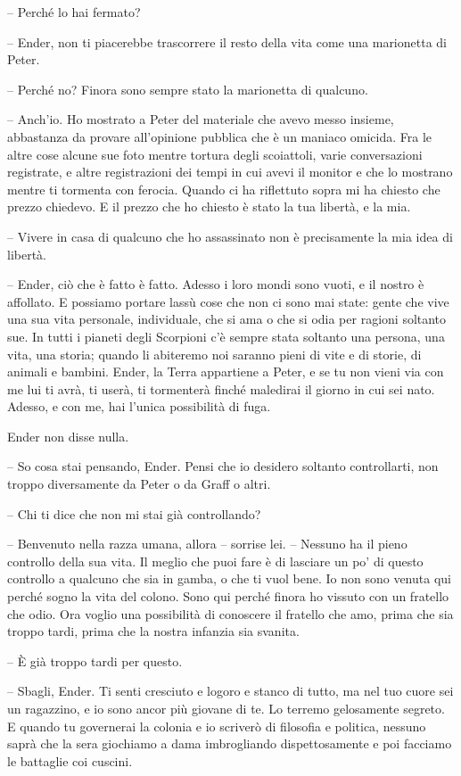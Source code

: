 {-- Perché lo hai fermato?}

{-- Ender, non ti piacerebbe trascorrere il resto della vita come una
	marionetta di Peter.}

{-- Perché no? Finora sono sempre stato la marionetta di qualcuno.}

{-- Anch'io. Ho mostrato a Peter del materiale che avevo messo insieme,
	abbastanza da provare all'opinione pubblica che è un maniaco omicida.
	Fra le altre cose alcune sue foto mentre tortura degli scoiattoli, varie
	conversazioni registrate, e altre registrazioni dei tempi in cui avevi
	il monitor e che lo mostrano mentre ti tormenta con ferocia. Quando ci
	ha riflettuto sopra mi ha chiesto che prezzo chiedevo. E il prezzo che
	ho chiesto è stato la tua libertà, e la mia.}

{-- Vivere in casa di qualcuno che ho assassinato non è precisamente la
	mia idea di libertà.}

{-- Ender, ciò che è fatto è fatto. Adesso i loro mondi sono vuoti, e il
	nostro è affollato. E possiamo portare lassù cose che non ci sono mai
	state: gente che vive una sua vita personale, individuale, che si ama o
	che si odia per ragioni soltanto sue. In tutti i pianeti degli Scorpioni
	c'è sempre stata soltanto una persona, una vita, una storia; quando li
	abiteremo noi saranno pieni di vite e di storie, di animali e bambini.
	Ender, la Terra appartiene a Peter, e se tu non vieni via con me lui ti
	avrà, ti userà, ti tormenterà finché maledirai il giorno in cui sei
	nato. Adesso, e con me, hai l'unica possibilità di fuga.}

{Ender non disse nulla.}

{-- So cosa stai pensando, Ender. Pensi che io desidero soltanto
	controllarti, non troppo diversamente da Peter o da Graff o altri.}

{-- Chi ti dice che non mi stai già controllando?}

{-- Benvenuto nella razza umana, allora -- sorrise lei. -- Nessuno ha il
	pieno controllo della sua vita. Il meglio che puoi fare è di lasciare un
	po' di questo controllo a qualcuno che sia in gamba, o che ti vuol bene.
	Io non sono venuta qui perché sogno la vita del colono. Sono qui perché
	finora ho vissuto con un fratello che odio. Ora voglio una possibilità
	di conoscere il fratello che amo, prima che sia troppo tardi, prima che
	la nostra infanzia sia svanita.}

{-- È già troppo tardi per questo.}

{-- Sbagli, Ender. Ti senti cresciuto e logoro e stanco di tutto, ma nel
	tuo cuore sei un ragazzino, e io sono ancor più giovane di te. Lo
	terremo gelosamente segreto. E quando tu governerai la colonia e io
	scriverò di filosofia e politica, nessuno saprà che la sera giochiamo a
	dama imbrogliando dispettosamente e poi facciamo le battaglie coi
	cuscini.}

